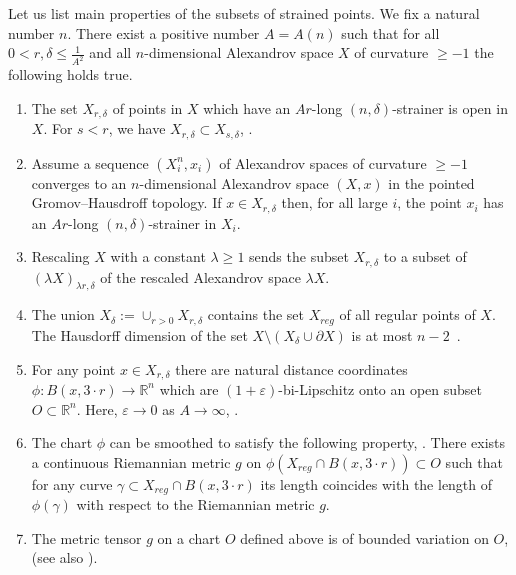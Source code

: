 \documentclass[12pt,leqno,intlimits]{amsart}
\numberwithin{equation}{section}
\theoremstyle{definition}
\theoremstyle{remark}
\newcommand{\R}{\mathbb{R}}
\def\:{\colon}
\begin{document}
Let us list main properties of the subsets of strained points.
We fix a natural number $n$.
There exist a positive number $A=A(n)$ such that for all $0<r,\delta \leq \frac 1 {A^2}$ and all $n$-dimensional Alexandrov space $X$ of curvature $\geq -1$ the following holds true.
\begin{enumerate}

\item The set $X_{r,\delta}$ of points in $X$ which have an $Ar$-long $(n,\delta)$-strainer is open in $X$. For $s<r$, we have $X_{r,\delta} \subset X_{s,\delta}$, \cite[9.7]{BGP}.

\item Assume a sequence $(X_i ^n,x_i)$ of Alexandrov spaces of curvature $\geq -1$ converges to an $n$-dimensional Alexandrov space $(X,x)$ in the pointed Gromov--Hausdroff topology.
If $x\in X_{r,\delta}$ then, for all large $i$, the point $x_i$ has an $Ar$-long $(n, \delta)$-strainer in $X_i$.

\item Rescaling $X$ with a constant $\lambda \geq 1$ sends the subset $X_{r,\delta}$ to a subset of $(\lambda X )_{\lambda r, \delta} $ of the rescaled Alexandrov space $\lambda X$.

\item The union $X_{\delta}:= \cup _{r>0} X_{r,\delta}$ contains the set $X_{reg}$ of all regular points of $X$. The Hausdorff dimension of the set $X\setminus (X_{\delta} \cup \partial X)$ is at most $n-2$~\cite[10.6, 10.6.1, 12.8]{BGP}.

\item For any point $x\in X_{r,\delta}$ there are natural distance coordinates $\phi\: B (x,{3{\cdot}r}) \to \R^n$ which are $(1+\varepsilon)$-bi-Lipschitz onto an open subset $O \subset \R^n$. Here, $\varepsilon\to 0$ as $A\to\infty$, \cite[9.4]{BGP}.

\item The chart $\phi$ can be smoothed to satisfy the following property, \cite[Theorem B]{Otsu-Shioya}.
There exists a continuous Riemannian metric $g$ on $\phi (X_{reg} \cap B (x,{3{\cdot}r})) \subset O$ such that for any curve $\gamma \subset X_{reg} \cap B(x,{3{\cdot}r})$ its length
coincides with the length of $\phi (\gamma )$ with respect to the Riemannian metric $g$.

\item The metric tensor $g$ on a chart $O$ defined above is of bounded variation on $O$, \cite[4.2]{Per-DC} (see also \cite{AB15}).
\end{enumerate}
\end{document}
